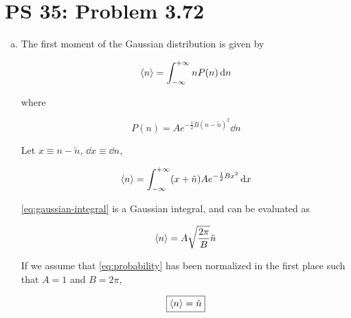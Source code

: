 \documentclass[12pt,a4paper,twocolumn]{article}
\begin{document}
\setcounter{page}{1}

\section*{PS 35: Problem 3.72}
\bigskip

\begin{enumerate}[(a)]

\item The first moment of the Gaussian distribution is given by

\begin{equation}\label{eq:1st-moment}
	\ev{n} = \int_{-\infty}^{+\infty} nP(n) \dd{n}
\end{equation}

where

\begin{equation}\label{eq:probability}
	P(n) = Ae^{-\frac{1}{2}B(n - \tilde{n})^2} \dd{n}
\end{equation}

Let $x \equiv n - \tilde{n}$, $\dd{x} \equiv \dd{n}$,

\begin{equation}\label{eq:gaussian-integral}
	\ev{n} = \int_{-\infty}^{+\infty} (x + \tilde{n}) Ae^{-\frac{1}{2}Bx^2} \dd{x}
\end{equation}

\eqref{eq:gaussian-integral} is a Gaussian integral, and can be evaluated as

\begin{equation}
	\ev{n} = A\sqrt{\frac{2\pi}{B}}\tilde{n}
\end{equation}

If we assume that \eqref{eq:probability} has been normalized in the first place such that $A = 1$ and $B = 2\pi$,

\begin{equation}
	\boxed{
		\ev{n} = \tilde{n}
	} \label{eq:answer-a}
\end{equation}

\end{enumerate}
\end{document}
